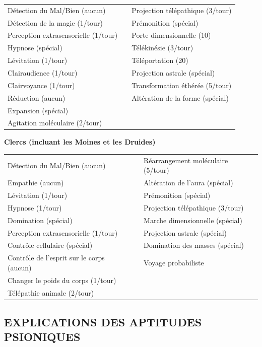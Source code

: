 \documentclass[11pt]{article}
\begin{document}
{\begin{tabular}{p{7.5cm}p{0.3cm}p{7.5cm}}
Détection du Mal/Bien (aucun) && Projection télépathique (3/tour) \\
Détection de la magie (1/tour) && Prémonition (spécial) \\
Perception extrasensorielle (1/tour) && Porte dimensionnelle (10) \\
Hypnose (spécial) && Télékinésie (3/tour) \\
Lévitation (1/tour) && Téléportation (20) \\
Clairaudience (1/tour) && Projection astrale (spécial) \\
Clairvoyance (1/tour) && Transformation éthérée (5/tour) \\
Réduction (aucun) && Altération de la forme (spécial) \\
Expansion (spécial) && \\
Agitation moléculaire (2/tour) && \\
\end{tabular}

\bigskip

\textbf{Clercs (incluant les Moines et les Druides)}

\bigskip

\begin{tabular}{p{7.5cm}p{0.3cm}p{7.5cm}}
Détection du Mal/Bien (aucun) && Réarrangement moléculaire (5/tour) \\
Empathie (aucun) && Altération de l'aura (spécial) \\
Lévitation (1/tour) && Prémonition (spécial) \\
Hypnose (1/tour) && Projection télépathique (3/tour) \\
Domination (spécial) && Marche dimensionnelle (spécial) \\
Perception extrasensorielle (1/tour) && Projection astrale (spécial) \\
Contrôle cellulaire (spécial) && Domination des masses (spécial) \\
Contrôle de l'esprit sur le corps (aucun) &&  Voyage probabiliste \\
Changer le poids du corps (1/tour) && \\
Télépathie animale (2/tour) && \\
\end{tabular}

\newpage
\subsection*{\normalsize EXPLICATIONS DES APTITUDES PSIONIQUES}

}
\end{document}
